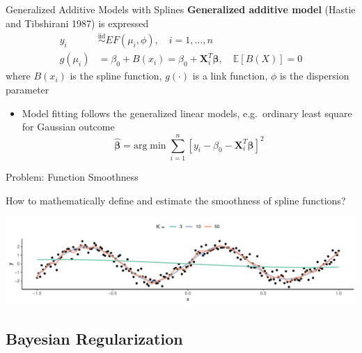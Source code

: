\documentclass[
  ignorenonframetext,
  aspectratio=169]{beamer}
\providecommand{\tightlist}{%
  \setlength{\itemsep}{0pt}\setlength{\parskip}{0pt}}
\newcommand{\bs}[1]{\boldsymbol{#1}}
\newcommand{\simiid}{\overset{\text{iid}}{\sim}}
\begin{document}
\begin{frame}{Generalized Additive Models with Splines}
\protect\hypertarget{generalized-additive-models-with-splines}{}
\textbf{Generalized additive model} (Hastie and Tibshirani 1987) is
expressed \begin{align*}
  y_i &\simiid EF(\mu_i, \phi), \quad i = 1, \dots, n\\
  g(\mu_i) &= \beta_0 + B(x_i) = \beta_0 + \bs X_i^T \bs \beta ,  \quad \mathbb{E}\left[B(X)\right] = 0 
\end{align*} where \(B(x_i)\) is the spline function, \(g(\cdot)\) is a
link function, \(\phi\) is the dispersion parameter

\vspace*{0.2cm}

\begin{itemize}
\tightlist
\item
  Model fitting follows the generalized linear models, e.g.~ordinary
  least square for Gaussian outcome \[
  \boldsymbol{\hat \beta} = \text{arg}\min \sum\limits^n_{i=1} \left[y_i - \beta_0 - \bs X_i^T \bs \beta \right]^2
  \]
\end{itemize}
\end{frame}

\begin{frame}{Problem: Function Smoothness}
\protect\hypertarget{problem-function-smoothness}{}
\begin{tcolorbox}[colback=green!5,colframe=green!40!black,title=Question]
How to mathematically define and estimate the smoothness of spline functions?
\end{tcolorbox}

\includegraphics{phd_defense_slides_files/figure-beamer/spline_overfitting-1.pdf}
\end{frame}

\hypertarget{bayesian-regularization}{%
\subsection{Bayesian Regularization}\label{bayesian-regularization}}
\end{document}
